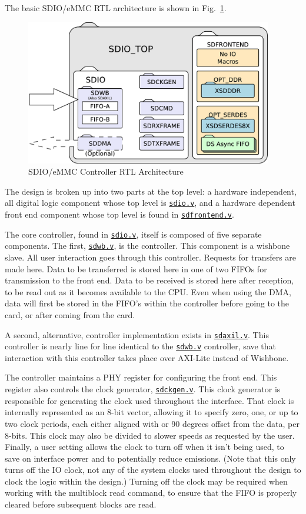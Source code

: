 \documentclass{gqtekspec}
\newcommand{\zhref}[2]{\href{#1}{\textcolor{dkblue}{#2}}}
\begin{document}
The basic SDIO/eMMC RTL architecture is shown in Fig.~\ref{fig:sdioblocks}.
\begin{figure}\begin{center}
\includegraphics[height=2.5in]{gfx/sdioblocks.eps}
\caption{SDIO/eMMC Controller RTL Architecture}\label{fig:sdioblocks}
\end{center}\end{figure}
The design is broken up into two parts at the top level: a hardware independent,
all digital logic component whose top level is \zhref{../rtl/sdio.v}{\tt sdio.v},
and a hardware dependent front end component whose top level is found in
\zhref{../rtl/sdfrontend.v}{\tt sdfrontend.v}.

The core controller, found in \zhref{../rtl/sdio.v}{\tt sdio.v}, itself is
composed of five separate components.  The first,
\zhref{../rtl/sdwb.v}{\tt sdwb.v}, is the controller.  This component is
a wishbone slave.  All user interaction goes through this controller.
Requests for transfers are made here.  Data to be transferred is stored here
in one of two FIFOs for transmission to the front end.  Data to be received
is stored here after reception, to be read out as it becomes available to the
CPU.  Even when using the DMA, data will first be stored in the FIFO's within
the controller before going to the card, or after coming from the card.

A second, alternative, controller implementation exists in
\zhref{../rtl/sdaxil.v}{\tt sdaxil.v}.  This controller is nearly line for line
identical to the \zhref{../rtl/sdwb.v}{\tt sdwb.v} controller, save that
interaction with this controller takes place over AXI-Lite instead of Wishbone.

The controller maintains a PHY register for configuring the front end.  This
register also controls the clock generator, \zhref{../rtl/sdckgen.v}{\tt sdckgen.v}.  This clock
generator is responsible for generating the clock used throughout the
interface.  That clock is internally represented as an 8-bit vector, allowing
it to specify zero, one, or up to two clock periods, each either aligned with
or 90 degrees offset from the data, per 8-bits.  This clock may also be divided
to slower speeds as requested by the user.  Finally, a user setting allows the
clock to turn off when it isn't being used, to save on interface power and
to potentially reduce emissions.  (Note that this only turns off the IO clock,
not any of the system clocks used throughout the design to clock the logic
within the design.)  Turning off the clock may be required when working with
the multiblock read command, to ensure that the FIFO is properly cleared before
subsequent blocks are read.
\end{document}
